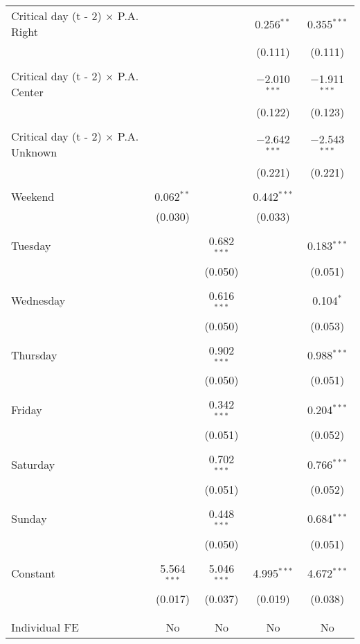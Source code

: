 \documentclass[
]{article}
\begin{document}
\begin{table}[!htbp]
{\begin{tabular}{@{\extracolsep{5pt}}lcccc}
 Critical day (t - 2) $\times$ P.A. Right &  &  & 0.256$^{**}$ & 0.355$^{***}$ \\ 
  &  &  & (0.111) & (0.111) \\ 
  & & & & \\ 
 Critical day (t - 2) $\times$ P.A. Center &  &  & $-$2.010$^{***}$ & $-$1.911$^{***}$ \\ 
  &  &  & (0.122) & (0.123) \\ 
  & & & & \\ 
 Critical day (t - 2) $\times$ P.A. Unknown &  &  & $-$2.642$^{***}$ & $-$2.543$^{***}$ \\ 
  &  &  & (0.221) & (0.221) \\ 
  & & & & \\ 
 Weekend & 0.062$^{**}$ &  & 0.442$^{***}$ &  \\ 
  & (0.030) &  & (0.033) &  \\ 
  & & & & \\ 
 Tuesday &  & 0.682$^{***}$ &  & 0.183$^{***}$ \\ 
  &  & (0.050) &  & (0.051) \\ 
  & & & & \\ 
 Wednesday &  & 0.616$^{***}$ &  & 0.104$^{*}$ \\ 
  &  & (0.050) &  & (0.053) \\ 
  & & & & \\ 
 Thursday &  & 0.902$^{***}$ &  & 0.988$^{***}$ \\ 
  &  & (0.050) &  & (0.051) \\ 
  & & & & \\ 
 Friday &  & 0.342$^{***}$ &  & 0.204$^{***}$ \\ 
  &  & (0.051) &  & (0.052) \\ 
  & & & & \\ 
 Saturday &  & 0.702$^{***}$ &  & 0.766$^{***}$ \\ 
  &  & (0.051) &  & (0.052) \\ 
  & & & & \\ 
 Sunday &  & 0.448$^{***}$ &  & 0.684$^{***}$ \\ 
  &  & (0.050) &  & (0.051) \\ 
  & & & & \\ 
 Constant & 5.564$^{***}$ & 5.046$^{***}$ & 4.995$^{***}$ & 4.672$^{***}$ \\ 
  & (0.017) & (0.037) & (0.019) & (0.038) \\ 
  & & & & \\ 
\hline \\[-1.8ex] 
Individual FE & No & No & No & No \\ 

\end{tabular}}
\end{table}
\end{document}
